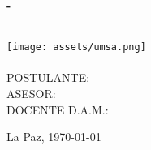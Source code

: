 \begin{titlepage}
	\centering
	{\bfseries \large \college - \collegefaculty \par \collegefield }\\[2cm]

	\texttt{[image: assets/umsa.png]}
	\\[1cm]

	{\LARGE \MakeUppercase{\documenttitle}}\\[1cm]

	\textbf{\Large \MakeUppercase{\projecttitle}}
	\vfill
	\MakeUppercase{Postulante: } \MakeUppercase{\student}\\[1cm]

	\MakeUppercase{Asesor: } \MakeUppercase{\tutor}\\[1cm]

	\MakeUppercase{Docente D.A.M.: } \MakeUppercase{\professor}\\[1cm]

	\vfill
	{La Paz, \today\par}
\end{titlepage}